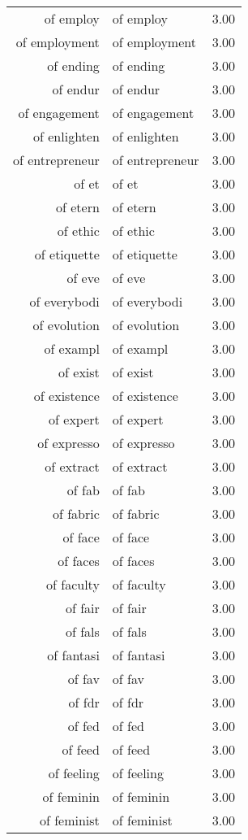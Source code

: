\begin{table}[ht]
\begin{tabular}{rlr}
  of employ & of employ & 3.00 \\ 
  of employment & of employment & 3.00 \\ 
  of ending & of ending & 3.00 \\ 
  of endur & of endur & 3.00 \\ 
  of engagement & of engagement & 3.00 \\ 
  of enlighten & of enlighten & 3.00 \\ 
  of entrepreneur & of entrepreneur & 3.00 \\ 
  of et & of et & 3.00 \\ 
  of etern & of etern & 3.00 \\ 
  of ethic & of ethic & 3.00 \\ 
  of etiquette & of etiquette & 3.00 \\ 
  of eve & of eve & 3.00 \\ 
  of everybodi & of everybodi & 3.00 \\ 
  of evolution & of evolution & 3.00 \\ 
  of exampl & of exampl & 3.00 \\ 
  of exist & of exist & 3.00 \\ 
  of existence & of existence & 3.00 \\ 
  of expert & of expert & 3.00 \\ 
  of expresso & of expresso & 3.00 \\ 
  of extract & of extract & 3.00 \\ 
  of fab & of fab & 3.00 \\ 
  of fabric & of fabric & 3.00 \\ 
  of face & of face & 3.00 \\ 
  of faces & of faces & 3.00 \\ 
  of faculty & of faculty & 3.00 \\ 
  of fair & of fair & 3.00 \\ 
  of fals & of fals & 3.00 \\ 
  of fantasi & of fantasi & 3.00 \\ 
  of fav & of fav & 3.00 \\ 
  of fdr & of fdr & 3.00 \\ 
  of fed & of fed & 3.00 \\ 
  of feed & of feed & 3.00 \\ 
  of feeling & of feeling & 3.00 \\ 
  of feminin & of feminin & 3.00 \\ 
  of feminist & of feminist & 3.00 \\ 

\end{tabular}
\end{table}
